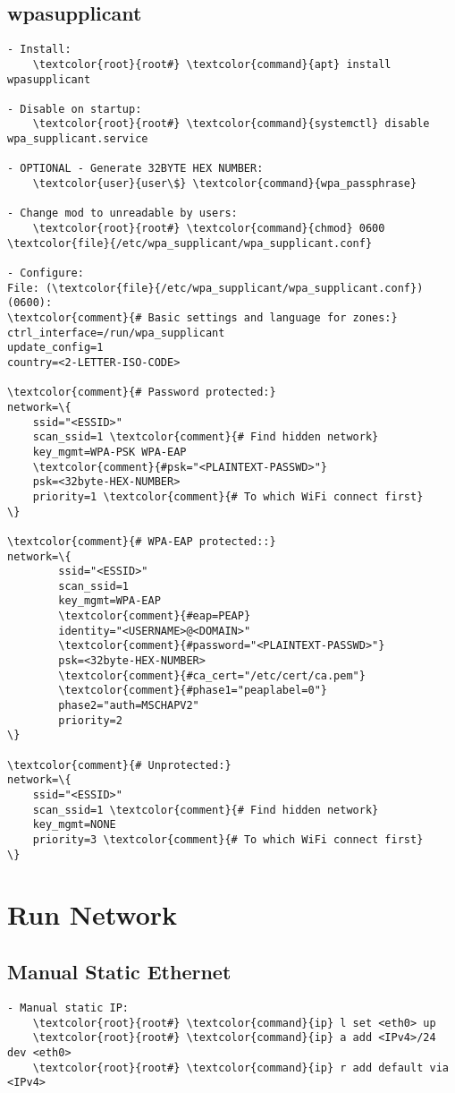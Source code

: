 \documentclass[10pt, a4paper, onecolumn, openany]{book} %
\begin{document}
\subsection{wpasupplicant}
\begin{Verbatim}[commandchars=\\\{\}]
- Install:
    \textcolor{root}{root#} \textcolor{command}{apt} install wpasupplicant

- Disable on startup:
    \textcolor{root}{root#} \textcolor{command}{systemctl} disable wpa_supplicant.service

- OPTIONAL - Generate 32BYTE HEX NUMBER:
    \textcolor{user}{user\$} \textcolor{command}{wpa_passphrase}

- Change mod to unreadable by users:
    \textcolor{root}{root#} \textcolor{command}{chmod} 0600 \textcolor{file}{/etc/wpa_supplicant/wpa_supplicant.conf}

- Configure:
File: (\textcolor{file}{/etc/wpa_supplicant/wpa_supplicant.conf}) (0600):
\textcolor{comment}{# Basic settings and language for zones:}
ctrl_interface=/run/wpa_supplicant
update_config=1
country=<2-LETTER-ISO-CODE>

\textcolor{comment}{# Password protected:}
network=\{
    ssid="<ESSID>"
    scan_ssid=1 \textcolor{comment}{# Find hidden network}
    key_mgmt=WPA-PSK WPA-EAP
    \textcolor{comment}{#psk="<PLAINTEXT-PASSWD>"}
    psk=<32byte-HEX-NUMBER>
    priority=1 \textcolor{comment}{# To which WiFi connect first}
\}

\textcolor{comment}{# WPA-EAP protected::}
network=\{
        ssid="<ESSID>"
        scan_ssid=1
        key_mgmt=WPA-EAP
        \textcolor{comment}{#eap=PEAP}
        identity="<USERNAME>@<DOMAIN>"
        \textcolor{comment}{#password="<PLAINTEXT-PASSWD>"}
        psk=<32byte-HEX-NUMBER>
        \textcolor{comment}{#ca_cert="/etc/cert/ca.pem"}
        \textcolor{comment}{#phase1="peaplabel=0"}
        phase2="auth=MSCHAPV2"
        priority=2
\}

\textcolor{comment}{# Unprotected:}
network=\{
    ssid="<ESSID>"
    scan_ssid=1 \textcolor{comment}{# Find hidden network}
    key_mgmt=NONE
    priority=3 \textcolor{comment}{# To which WiFi connect first}
\}
\end{Verbatim}


\section{Run Network}
\subsection{Manual Static Ethernet}
\begin{Verbatim}[commandchars=\\\{\}]
- Manual static IP:
    \textcolor{root}{root#} \textcolor{command}{ip} l set <eth0> up
    \textcolor{root}{root#} \textcolor{command}{ip} a add <IPv4>/24 dev <eth0>
    \textcolor{root}{root#} \textcolor{command}{ip} r add default via <IPv4>
\end{Verbatim}
\end{document}
